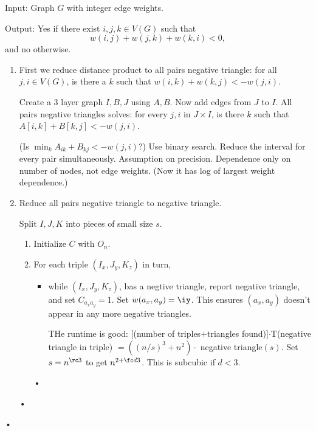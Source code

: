 \begin{prb}
Input: Graph $G$ with integer edge weights.

Output: Yes if there exist $i,j,k\in V(G)$ such that
\[
w(i,j)+w(j,k)+w(k,i)<0,
\]
and no otherwise.
\end{prb}
\begin{enumerate}
\item
First we reduce distance product to all pairs negative triangle: for all $j,i\in V(G)$, is there a $k$ such that $w(i,k)+w(k,j)<-w(j,i)$.

Create a 3 layer graph $I,B, J$ using $A,B$. Now add edges from $J$ to $I$. All pairs negative triangles solves: for every $j,i$ in $J\times I$, is there $k$ such that $A[i,k]+B[k,j]<-w(j,i)$.

(Is $\min_k A_{ik}+B_{kj}<-w(j,i)$?)
Use binary search. Reduce the interval for every pair simultaneously.
Assumption on precision. Dependence only on number of nodes, not edge weights. (Now it has log of largest weight dependence.)
\item
Reduce all pairs negative triangle to negative triangle.

Split $I,J,K$ into pieces of small size $s$. %

\begin{enumerate}
\item
Initialize $C$ with $O_n$.
\item
For each triple $(I_x,J_y,K_z)$ in turn,
\begin{itemize}
\item
while $(I_x,J_y,K_z)$, bas a negtive triangle, report negative triangle, and set $C_{a_xa_y}=1$. Set $w(a_x,a_y)=\iy$. This ensures $(a_x,a_y)$ doesn't appear in any more negative triangles.

THe runtime is good: [(number of triples$+$triangles found)]$\cdot$T(negative triangle in triple) $=((n/s)^3+n^2)\cdot$ negative triangle$(s)$.
Set $s=n^{\rc 3}$ to get $n^{2+\fc d3}$. This is subcubic if $d<3$.
\end{itemize}•
\end{enumerate}•
\end{enumerate}•

